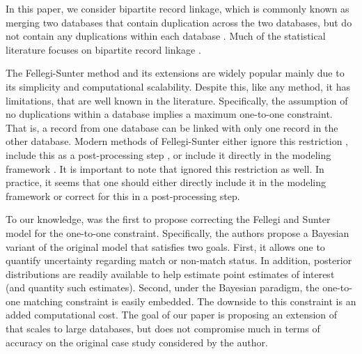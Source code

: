\documentclass[12pt,letterpaper]{article}
\newcommand{\1}[1]{\mathbb{I}\!\left[#1\right]} %
\begin{document}

In this paper, we consider bipartite record linkage, which is commonly known as merging two databases that contain duplication across the two databases, but do not contain any duplications within each database \citep{sadinle_bayesian_2017}. Much of the statistical literature focuses on bipartite record linkage \citep{fellegi_theory_1969, jaro1989, Winkler1988, belin_1995, larsen_2001, liseo_2011,  herzog2007data, gutman_bayesian_2013, sadinle_bayesian_2017}. 

The Fellegi-Sunter method and its extensions are widely popular mainly due to its simplicity and computational scalability. Despite this, like any method, it has limitations, that are well known in the literature. Specifically, the assumption of no duplications within a database implies a maximum one-to-one constraint. That is, a record from one database can be linked with only one record in the other database. Modern methods of Fellegi-Sunter either ignore this restriction \citep{Winkler1988, belin_1995, larsen_2001}, include this as a post-processing step \citep{jaro1989}, or include it directly in the modeling framework \citep{sadinle_bayesian_2017}. It is important to note that \cite{fellegi_theory_1969} ignored this restriction as well. In practice, it seems that one should either directly include it in the modeling framework or correct for this in a post-processing step. 

To our knowledge, \cite{sadinle_bayesian_2017} was the first to propose correcting the Fellegi and Sunter model for the one-to-one constraint. Specifically, the authors propose a Bayesian variant of the original model that satisfies two goals. First, it allows one to quantify uncertainty regarding match or non-match status. In addition, posterior distributions are readily available to help estimate point estimates of interest (and quantity such estimates). Second, under the Bayesian paradigm, the one-to-one matching constraint is easily embedded. The downside to this constraint is an added computational cost. The goal of our paper is proposing an extension of \cite{sadinle_bayesian_2017} that scales to large databases, but does not compromise much in terms of accuracy on the original case study considered by the author. 
\end{document}
